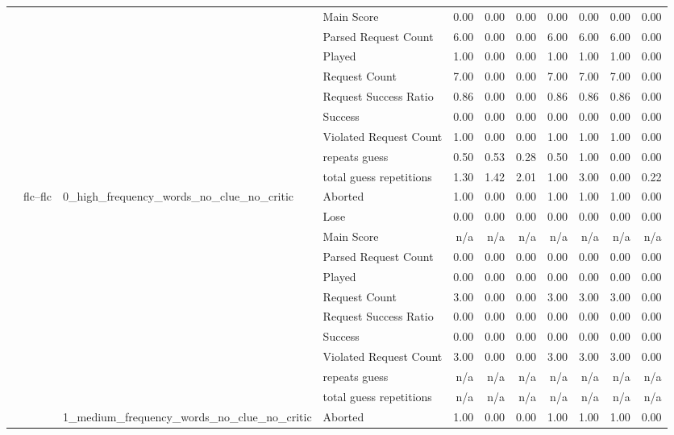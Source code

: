 \begin{tabular}{llllrrrrrrr}
 &  &  & Main Score & 0.00 & 0.00 & 0.00 & 0.00 & 0.00 & 0.00 & 0.00 \\
 &  &  & Parsed Request Count & 6.00 & 0.00 & 0.00 & 6.00 & 6.00 & 6.00 & 0.00 \\
 &  &  & Played & 1.00 & 0.00 & 0.00 & 1.00 & 1.00 & 1.00 & 0.00 \\
 &  &  & Request Count & 7.00 & 0.00 & 0.00 & 7.00 & 7.00 & 7.00 & 0.00 \\
 &  &  & Request Success Ratio & 0.86 & 0.00 & 0.00 & 0.86 & 0.86 & 0.86 & 0.00 \\
 &  &  & Success & 0.00 & 0.00 & 0.00 & 0.00 & 0.00 & 0.00 & 0.00 \\
 &  &  & Violated Request Count & 1.00 & 0.00 & 0.00 & 1.00 & 1.00 & 1.00 & 0.00 \\
 &  &  & repeats guess & 0.50 & 0.53 & 0.28 & 0.50 & 1.00 & 0.00 & 0.00 \\
 &  &  & total guess repetitions & 1.30 & 1.42 & 2.01 & 1.00 & 3.00 & 0.00 & 0.22 \\
\cline{2-11} \cline{3-11}
 & \multirow[t]{33}{*}{flc--flc} & \multirow[t]{11}{*}{0_high_frequency_words_no_clue_no_critic} & Aborted & 1.00 & 0.00 & 0.00 & 1.00 & 1.00 & 1.00 & 0.00 \\
 &  &  & Lose & 0.00 & 0.00 & 0.00 & 0.00 & 0.00 & 0.00 & 0.00 \\
 &  &  & Main Score & n/a & n/a & n/a & n/a & n/a & n/a & n/a \\
 &  &  & Parsed Request Count & 0.00 & 0.00 & 0.00 & 0.00 & 0.00 & 0.00 & 0.00 \\
 &  &  & Played & 0.00 & 0.00 & 0.00 & 0.00 & 0.00 & 0.00 & 0.00 \\
 &  &  & Request Count & 3.00 & 0.00 & 0.00 & 3.00 & 3.00 & 3.00 & 0.00 \\
 &  &  & Request Success Ratio & 0.00 & 0.00 & 0.00 & 0.00 & 0.00 & 0.00 & 0.00 \\
 &  &  & Success & 0.00 & 0.00 & 0.00 & 0.00 & 0.00 & 0.00 & 0.00 \\
 &  &  & Violated Request Count & 3.00 & 0.00 & 0.00 & 3.00 & 3.00 & 3.00 & 0.00 \\
 &  &  & repeats guess & n/a & n/a & n/a & n/a & n/a & n/a & n/a \\
 &  &  & total guess repetitions & n/a & n/a & n/a & n/a & n/a & n/a & n/a \\
\cline{3-11}
 &  & \multirow[t]{11}{*}{1_medium_frequency_words_no_clue_no_critic} & Aborted & 1.00 & 0.00 & 0.00 & 1.00 & 1.00 & 1.00 & 0.00 \\

\end{tabular}
